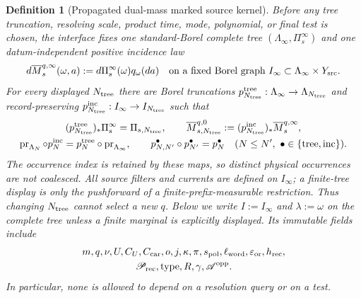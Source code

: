 \documentclass[11pt]{article}
\newtheorem{definition}[theorem]{Definition}
\begin{document}
\begin{definition}[Propagated dual-mass marked source kernel]
Before any tree truncation, resolving scale, product time, mode, polynomial,
or final test is chosen, the interface fixes one standard-Borel complete
tree $(\Lambda_\infty,\Pi_s^\infty)$ and one datum-independent positive
incidence law
\begin{equation}
\label{eq:datum-independent-source-incidence-law}
 d\overline M_{s}^{q,\infty}(\omega,a)
 :=d\Pi_s^\infty(\omega)q_\omega(da)
 \quad\hbox{on a fixed Borel graph }
 I_\infty\subset\Lambda_\infty\times Y_{\rm src}.
\end{equation}
For every displayed $N_{\rm tree}$ there are Borel truncations
$p_{N_{\rm tree}}^{\rm tree}:\Lambda_\infty\to\Lambda_{N_{\rm tree}}$
and record-preserving
$p_{N_{\rm tree}}^{\rm inc}:I_\infty\to I_{N_{\rm tree}}$ such that
\begin{equation}
\label{eq:tree-truncation-projective-law}
 \begin{gathered}
 (p_{N_{\rm tree}}^{\rm tree})_*\Pi_s^\infty=\Pi_{s,N_{\rm tree}},
 \qquad
 \overline M_{s,N_{\rm tree}}^{q,0}
 :=(p_{N_{\rm tree}}^{\rm inc})_*
       \overline M_s^{q,\infty},
 \\
 \operatorname{pr}_{\Lambda_N}\circ p_N^{\rm inc}
 =p_N^{\rm tree}\circ\operatorname{pr}_{\Lambda_\infty},
 \qquad
 p_{N,N'}^{\bullet}\circ p_{N'}^{\bullet}=p_N^{\bullet}
 \quad(N\le N',\ \bullet\in\{{\rm tree},{\rm inc}\}).
 \end{gathered}
\end{equation}
The occurrence index is retained by these maps, so distinct physical
occurrences are not coalesced.  All source filters and currents are defined
on $I_\infty$; a finite-tree display is only the pushforward of a
finite-prefix-measurable restriction.  Thus changing $N_{\rm tree}$ cannot
select a new $q$.  Below we write $I:=I_\infty$ and $\lambda:=\omega$ on
the complete tree unless a finite marginal is explicitly displayed.
Its immutable fields include
\[
 \begin{gathered}
 m,q,\nu,U,C_U,C_{\rm car},o,j,\kappa,\pi,s_{\rm pol},
 \ell_{\rm word},\varepsilon_{\rm or},h_{\rm rec},\\
 \mathscr P_{\rm rec},\operatorname{type},R,\gamma,
 \mathscr A^{\rm opp}.
 \end{gathered}
\]
In particular, none is
allowed to depend on a resolution query or on a test.


\end{definition}
\end{document}
